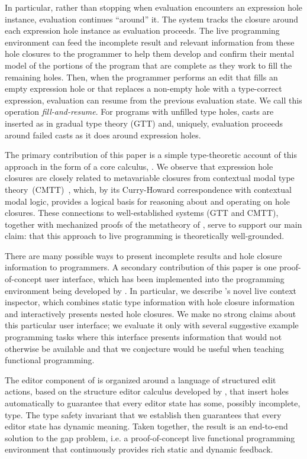 In particular, rather than stopping when evaluation encounters an expression hole instance, evaluation continues ``around'' it.   
The system tracks the closure around each expression hole instance as evaluation proceeds. The live programming environment can feed the incomplete result and relevant information from these {hole closures} to the programmer to help them develop and confirm their mental model of the portions of the program that are complete as they work to fill the remaining holes. 
Then, when the programmer performs an edit that fills an empty expression hole or that replaces a non-empty hole with a type-correct expression, evaluation can resume from the previous evaluation state. We call this operation \emph{fill-and-resume}. For programs with unfilled type holes, casts are inserted as in gradual type theory (GTT) \cite{DBLP:conf/snapl/SiekVCB15} and, uniquely, evaluation proceeds around failed casts as it does around expression holes. 

The primary contribution of this paper is a simple type-theoretic account of this approach in the form of a core calculus, \HazelnutLive. We observe that expression hole closures are closely related to metavariable closures from contextual modal type theory~(CMTT)~\cite{Nanevski2008}, which, by its Curry-Howard correspondence with contextual modal logic, provides a logical basis for reasoning about and operating on hole closures. These connections to well-established systems (GTT and CMTT), together with mechanized proofs of the metatheory of \HazelnutLive, serve to support our main claim: that this approach to live programming is theoretically well-grounded.

There are many possible ways to present incomplete results and hole closure information to programmers. A secondary contribution of this paper is one  proof-of-concept user interface, which has been implemented into the \Hazel programming environment being developed by \citet{HazelnutSNAPL}. In particular, we describe \Hazel's novel live context inspector, which  combines static type information with hole closure information and interactively presents nested hole closures. We make no strong claims about this particular user interface; we evaluate it only with several suggestive example programming tasks where this interface presents information that would not otherwise be available and that we conjecture would be useful when teaching functional programming.

The editor component of \Hazel is organized around a language of structured edit actions, 
based on the \Hazelnut structure editor calculus developed by \citet{popl-paper}, that insert holes automatically to guarantee that
every editor state has some, possibly incomplete, type. 
The type safety invariant that we establish then guarantees that every editor state has dynamic meaning. Taken together, the result is an end-to-end solution to the gap problem, i.e. a proof-of-concept
live functional programming environment that continuously provides rich static and dynamic feedback.

